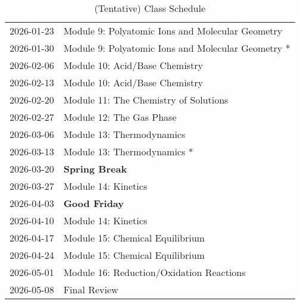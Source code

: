 \documentclass[11pt, oneside]{article}   	%
\begin{document}
\begin{table}[h]
\begin{tabular}{ l | l }
2026-01-23 & Module 9: Polyatomic Ions and Molecular Geometry \\
2026-01-30 & Module 9: Polyatomic Ions and Molecular Geometry * \\
2026-02-06 & Module 10: Acid/Base Chemistry \\
2026-02-13 & Module 10: Acid/Base Chemistry \\
2026-02-20 & Module 11: The Chemistry of Solutions \\
2026-02-27 & Module 12: The Gas Phase \\
2026-03-06 & Module 13: Thermodynamics \\
2026-03-13 & Module 13: Thermodynamics * \\
2026-03-20 & \textbf{Spring Break} \\
2026-03-27 & Module 14: Kinetics \\
2026-04-03 & \textbf{Good Friday} \\
2026-04-10 & Module 14: Kinetics \\
2026-04-17 & Module 15: Chemical Equilibrium \\
2026-04-24 & Module 15: Chemical Equilibrium \\
2026-05-01 & Module 16: Reduction/Oxidation Reactions \\
2026-05-08 & Final Review \\
\end{tabular}
\caption{(Tentative) Class Schedule}\label{table:class-schedule}
\end{table}
\end{document}
